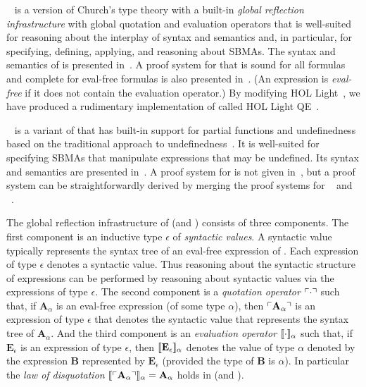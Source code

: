 \documentclass[fleqn]{llncs}
\begin{document}
{\churchqe}~\cite{Farmer18} is a version of Church's type theory with
a built-in \emph{global reflection infrastructure} with global
quotation and evaluation operators that is well-suited for reasoning
about the interplay of syntax and semantics and, in particular, for
specifying, defining, applying, and reasoning about SBMAs.  The syntax
and semantics of {\churchqe} is presented in~\cite{Farmer18}.  A proof
system for {\churchqe} that is sound for all formulas and complete for
eval-free formulas is also presented in~\cite{Farmer18}.  (An
expression is \emph{eval-free} if it does not contain the evaluation
operator.) By modifying HOL Light~\cite{Harrison09}, we have produced
a rudimentary implementation of {\churchqe} called HOL Light
QE~\cite{CaretteFarmerLaskowski18}.

{\churchuqe}~\cite{Farmer17} is a variant of {\churchqe} that has
built-in support for partial functions and undefinedness based on the
traditional approach to undefinedness~\cite{Farmer04}.  It is
well-suited for specifying SBMAs that manipulate expressions that may
be undefined.  Its syntax and semantics are presented
in~\cite{Farmer17}.  A proof system for {\churchuqe} is not given
in~\cite{Farmer17}, but a proof system can be straightforwardly
derived by merging the proof systems for {\churchqe}~\cite{Farmer18}
and {\qzerou}~\cite{Farmer08a}.

The global reflection infrastructure of {\churchuqe} (and {\churchqe})
consists of three components.  The first component is an inductive
type $\epsilon$ of \emph{syntactic values}.  A syntactic value
typically represents the syntax tree of an eval-free expression of
{\churchuqe}.  Each expression of type $\epsilon$ denotes a syntactic
value.  Thus reasoning about the syntactic structure of expressions
can be performed by reasoning about syntactic values via the
expressions of type $\epsilon$.  The second component is a
\emph{quotation operator} $\ulcorner\cdot\urcorner$ such that, if
$\textbf{A}_\alpha$ is an eval-free expression (of some type
$\alpha$), then $\ulcorner\textbf{A}_\alpha\urcorner$ is an expression of
type $\epsilon$ that denotes the syntactic value that represents the
syntax tree of $\textbf{A}_\alpha$.  And the third component is an
\emph{evaluation operator} $\llbracket\cdot\rrbracket_\alpha$ such that, if
$\textbf{E}_\epsilon$ is an expression of type $\epsilon$, then
$\llbracket\textbf{E}_\epsilon\rrbracket_\alpha$ denotes the value of type
$\alpha$ denoted by the expression $\textbf{B}$ represented by
$\textbf{E}_\epsilon$ (provided the type of $\textbf{B}$ is $\alpha$).
In particular the \emph{law of disquotation}
$\llbracket\ulcorner\textbf{A}_\alpha\urcorner\rrbracket_\alpha = \textbf{A}_\alpha$
holds in {\churchuqe} (and {\churchqe}).
\end{document}

